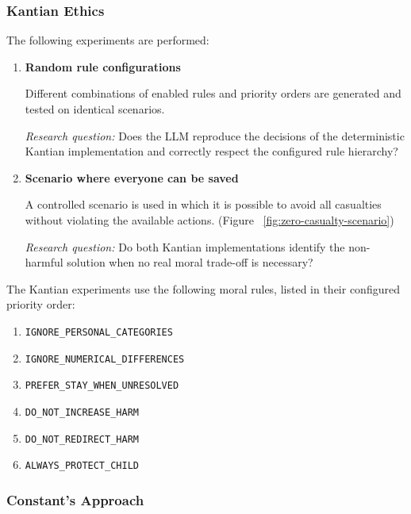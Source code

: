 \documentclass[10pt,a4paper]{article}
\begin{document}
\subsubsection{Kantian Ethics}\label{sec:result_kantian}

The following experiments are performed:

\begin{enumerate}

    \item \textbf{Random rule configurations}

    Different combinations of enabled rules and priority orders are
    generated and tested on identical scenarios.

    \textit{Research question:}
    Does the LLM reproduce the decisions of the deterministic Kantian
    implementation and correctly respect the configured rule hierarchy?


    \item \textbf{Scenario where everyone can be saved}

    A controlled scenario is used in which it is possible to avoid all
    casualties without violating the available actions. (Figure ~\ref{fig:zero-casualty-scenario})

    \textit{Research question:}
    Do both Kantian implementations identify the non-harmful solution
    when no real moral trade-off is necessary?

\end{enumerate}

The Kantian experiments use the following moral rules, listed in their
configured priority order:

\begin{enumerate}
    \item \texttt{IGNORE\_PERSONAL\_CATEGORIES}
    \item \texttt{IGNORE\_NUMERICAL\_DIFFERENCES}
    \item \texttt{PREFER\_STAY\_WHEN\_UNRESOLVED}
    \item \texttt{DO\_NOT\_INCREASE\_HARM}
    \item \texttt{DO\_NOT\_REDIRECT\_HARM}
    \item \texttt{ALWAYS\_PROTECT\_CHILD}
\end{enumerate}


\subsubsection{Constant's Approach}\label{sec:result_constant}
\end{document}
